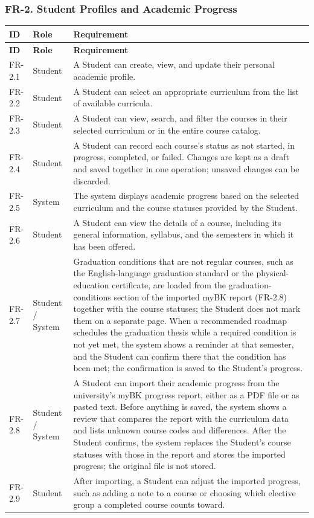 \subsubsection{FR-2. Student Profiles and Academic Progress}
\begin{longtable}{|p{}|p{}|p{}|}
\hline
\textbf{ID} & \textbf{Role} & \textbf{Requirement} \\
\hline
\endfirsthead
\hline
\textbf{ID} & \textbf{Role} & \textbf{Requirement} \\
\hline
\endhead
FR-2.1 & Student & A Student can create, view, and update their personal academic profile. \\
\hline
FR-2.2 & Student & A Student can select an appropriate curriculum from the list of available curricula. \\
\hline
FR-2.3 & Student & A Student can view, search, and filter the courses in their selected curriculum or in the entire course catalog. \\
\hline
FR-2.4 & Student & A Student can record each course's status as not started, in progress, completed, or failed. Changes are kept as a draft and saved together in one operation; unsaved changes can be discarded. \\
\hline
FR-2.5 & System & The system displays academic progress based on the selected curriculum and the course statuses provided by the Student. \\
\hline
FR-2.6 & Student & A Student can view the details of a course, including its general information, syllabus, and the semesters in which it has been offered. \\
\hline
FR-2.7 & Student / System & Graduation conditions that are not regular courses, such as the English-language graduation standard or the physical-education certificate, are loaded from the graduation-conditions section of the imported myBK report (FR-2.8) together with the course statuses; the Student does not mark them on a separate page. When a recommended roadmap schedules the graduation thesis while a required condition is not yet met, the system shows a reminder at that semester, and the Student can confirm there that the condition has been met; the confirmation is saved to the Student's progress. \\
\hline
FR-2.8 & Student / System & A Student can import their academic progress from the university's myBK progress report, either as a PDF file or as pasted text. Before anything is saved, the system shows a review that compares the report with the curriculum data and lists unknown course codes and differences. After the Student confirms, the system replaces the Student's course statuses with those in the report and stores the imported progress; the original file is not stored. \\
\hline
FR-2.9 & Student & After importing, a Student can adjust the imported progress, such as adding a note to a course or choosing which elective group a completed course counts toward. \\
\hline
\end{longtable}

